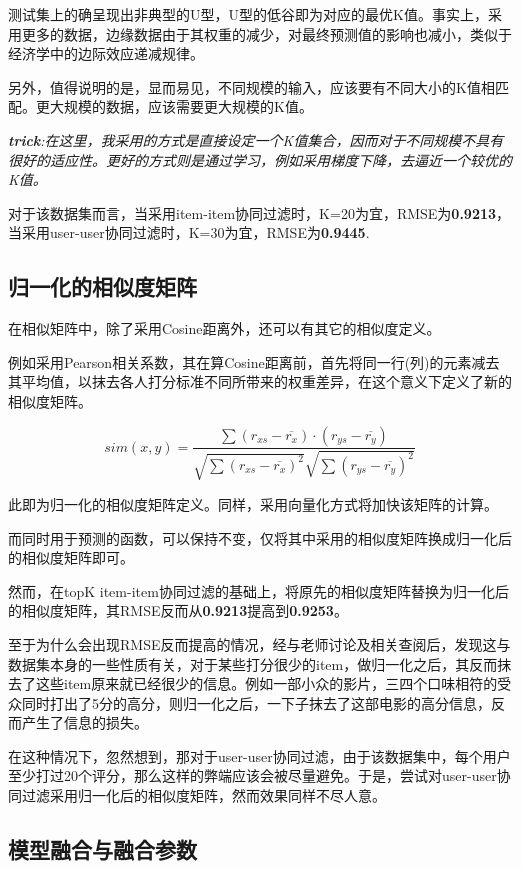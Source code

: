 \documentclass[utf8, a4paper,11pt, onecolumn]{ctexart}
\begin{document}
\begin{spacing}{1.3}
测试集上的确呈现出非典型的U型，U型的低谷即为对应的最优K值。事实上，采用更多的数据，边缘数据由于其权重的减少，对最终预测值的影响也减小，类似于经济学中的边际效应递减规律。

另外，值得说明的是，显而易见，不同规模的输入，应该要有不同大小的K值相匹配。更大规模的数据，应该需要更大规模的K值。

\textit{\textbf{trick}:在这里，我采用的方式是直接设定一个K值集合，因而对于不同规模不具有很好的适应性。更好的方式则是通过学习，例如采用梯度下降，去逼近一个较优的K值。}

对于该数据集而言，当采用item-item协同过滤时，K=20为宜，RMSE为\textbf{0.9213}，当采用user-user协同过滤时，K=30为宜，RMSE为\textbf{0.9445}.

\subsection{归一化的相似度矩阵}

在相似矩阵中，除了采用Cosine距离外，还可以有其它的相似度定义。

例如采用Pearson相关系数，其在算Cosine距离前，首先将同一行(列)的元素减去其平均值，以抹去各人打分标准不同所带来的权重差异，在这个意义下定义了新的相似度矩阵。

\[sim(x,y) = \frac{\sum (r_{xs}-\overline{r_{x}}) \cdot (r_{ys}-\overline{r_{y}})} {\sqrt{\sum (r_{xs}-\overline{r_{x}})^2} \sqrt{\sum (r_{ys}-\overline{r_{y}})^2}}\]

此即为归一化的相似度矩阵定义。同样，采用向量化方式将加快该矩阵的计算。

而同时用于预测的函数，可以保持不变，仅将其中采用的相似度矩阵换成归一化后的相似度矩阵即可。

然而，在topK item-item协同过滤的基础上，将原先的相似度矩阵替换为归一化后的相似度矩阵，其RMSE反而从\textbf{0.9213}提高到\textbf{0.9253}。

至于为什么会出现RMSE反而提高的情况，经与老师讨论及相关查阅后，发现这与数据集本身的一些性质有关，对于某些打分很少的item，做归一化之后，其反而抹去了这些item原来就已经很少的信息。例如一部小众的影片，三四个口味相符的受众同时打出了5分的高分，则归一化之后，一下子抹去了这部电影的高分信息，反而产生了信息的损失。

在这种情况下，忽然想到，那对于user-user协同过滤，由于该数据集中，每个用户至少打过20个评分，那么这样的弊端应该会被尽量避免。于是，尝试对user-user协同过滤采用归一化后的相似度矩阵，然而效果同样不尽人意。


\subsection{模型融合与融合参数}


\end{spacing}
\end{document}
